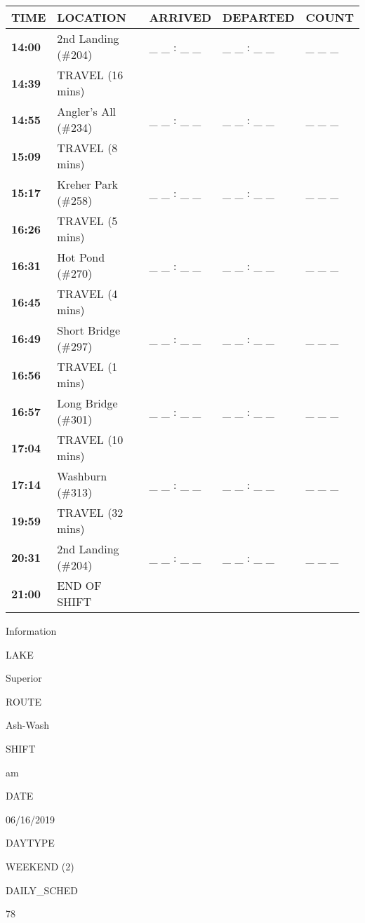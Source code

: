 \documentclass[]{article}
\begin{document}
\begin{tabular}{>{\bfseries}lllll}
\toprule
\textbf{TIME} & \textbf{LOCATION} & \textbf{ARRIVED} & \textbf{DEPARTED} & \textbf{COUNT}\\
\midrule
14:00 & 2nd Landing (\#204) & \_ \_ : \_ \_ & \_ \_ : \_ \_ & \_ \_ \_\\
14:39 & TRAVEL (16 mins) &  &  & \\
14:55 & Angler's All (\#234) & \_ \_ : \_ \_ & \_ \_ : \_ \_ & \_ \_ \_\\
15:09 & TRAVEL (8 mins) &  &  & \\
15:17 & Kreher Park (\#258) & \_ \_ : \_ \_ & \_ \_ : \_ \_ & \_ \_ \_\\
16:26 & TRAVEL (5 mins) &  &  & \\
16:31 & Hot Pond (\#270) & \_ \_ : \_ \_ & \_ \_ : \_ \_ & \_ \_ \_\\
16:45 & TRAVEL (4 mins) &  &  & \\
16:49 & Short Bridge (\#297) & \_ \_ : \_ \_ & \_ \_ : \_ \_ & \_ \_ \_\\
16:56 & TRAVEL (1 mins) &  &  & \\
16:57 & Long Bridge (\#301) & \_ \_ : \_ \_ & \_ \_ : \_ \_ & \_ \_ \_\\
17:04 & TRAVEL (10 mins) &  &  & \\
17:14 & Washburn (\#313) & \_ \_ : \_ \_ & \_ \_ : \_ \_ & \_ \_ \_\\
19:59 & TRAVEL (32 mins) &  &  & \\
20:31 & 2nd Landing (\#204) & \_ \_ : \_ \_ & \_ \_ : \_ \_ & \_ \_ \_\\
21:00 & END OF SHIFT &  &  & \\
\bottomrule
\end{tabular}\newpage

Information

LAKE

Superior

ROUTE

Ash-Wash

SHIFT

am

DATE

06/16/2019

DAYTYPE

WEEKEND (2)

DAILY\_SCHED

78

\vspace{24pt}
\end{document}
